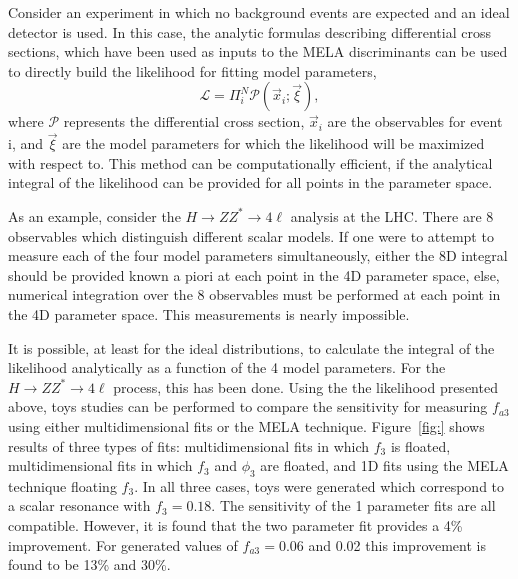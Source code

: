 Consider an experiment in which no background events are expected
and an ideal detector is used.  In this case, the analytic formulas
describing differential cross
sections, which have been used as inputs to the MELA discriminants
can be used to directly build the likelihood for fitting 
model parameters,
\begin{equation}
\mathscr{L}=\Pi^N_i \mathscr{P}(\vec{x}_i ; \vec{\xi}),
\end{equation}
where $\mathscr{P}$ represents the differential cross section, 
$\vec{x}_i$ are the observables for event i, and $\vec{\xi}$ 
are the model parameters for which the likelihood will be 
maximized with respect to.
This method can be computationally efficient, if the analytical
integral of the likelihood can be provided for all points in the
parameter space.  

As an example, consider the 
$H\to ZZ^*\to4\ell$ analysis at the LHC.  There are 8 observables
which distinguish different scalar models.  If one were to 
attempt to measure each of the four model parameters simultaneously,
either the 8D integral should be provided known a piori at each
point in the 4D parameter space, else, numerical integration 
over the 8 observables must be performed at each point in the 
4D parameter space.  This measurements is nearly impossible.  

It is possible, at least for the ideal
distributions, to calculate the integral of the likelihood
analytically as a function of the
4 model parameters.  For the $H\to ZZ^*\to 4\ell$ process, this
has been done.  Using the the likelihood presented above, 
toys studies can be performed to compare the sensitivity for 
measuring $f_{a3}$ using either multidimensional fits or the
MELA technique.  Figure~\ref{fig:} shows results of three 
types of fits: multidimensional fits in which $f_{3}$ is
floated, multidimensional fits in which $f_{3}$ and $\phi_{3}$
are floated, and 1D fits using the MELA technique floating $f_{3}$.
In all three cases, toys were generated which correspond to
a scalar resonance with $f_{3}=0.18$.  The sensitivity of the
1 parameter fits are all compatible.  However, it is found that
the two parameter fit provides a 4\% improvement.  For generated
values of $f_{a3}=0.06$ and 0.02 this improvement is found to be
13\% and 30\%.

\begin{figure}
\begin{center}
\caption{}
\label{fig:fa3MultiDimComp}
\end{center}
\end{figure}

